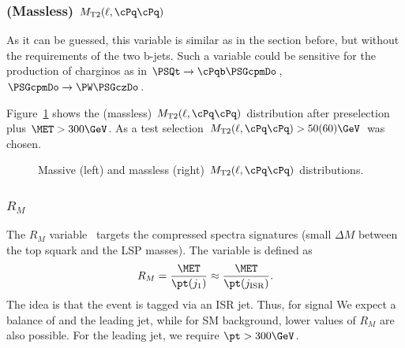 \subsubsection{(Massless) $\MTt(\ell,\cPq\cPq)$}

As it can be guessed, this variable is similar as in the section before, but without the requirements of the two b-jets. Such a variable could be sensitive for the production of charginos as in $\PSQt\to\cPqb\PSGcpmDo$, $\PSGcpmDo\to\PW\PSGczDo$.

Figure~\ref{fig:sigvarstudy:MT2lqq} shows the (massless) $\MTt(\ell,\cPq\cPq)$ distribution after preselection plus $\MET>300\GeV$. As a test selection $\MTt(\ell,\cPq\cPq)>50(60)\GeV$ was chosen.

\begin{figure}
\caption{\label{fig:sigvarstudy:MT2lqq} Massive (left) and massless (right) $\MTt(\ell,\cPq\cPq)$ distributions.}
\end{figure}

\subsubsection{$R_M$}
The $R_M$ variable~\cite{An:2015uwa} targets the compressed spectra signatures (small $\Delta M$ between the top squark and the LSP masses).
The variable is defined as 
\begin{equation}
R_M =  \frac{\MET}{\pt(j_1)} \approx \frac{\MET}{\pt(j_\mathrm{ISR})}.
\end{equation}
The idea is that the event is tagged via an ISR jet. Thus, for signal We expect a balance of \MET and the leading jet, while for SM background, lower values of $R_M$ are also possible.
For the leading jet, we require $\pt>300\GeV$.

